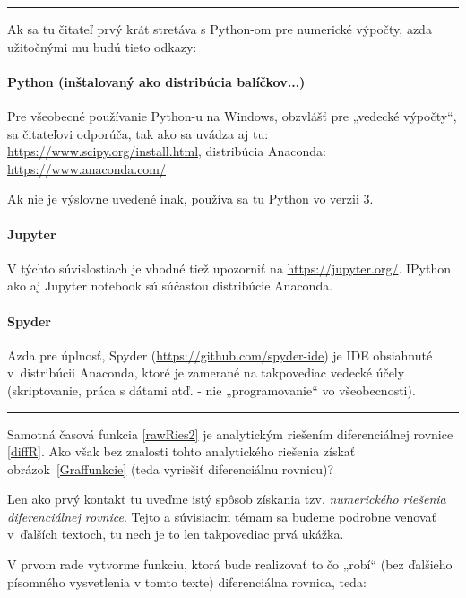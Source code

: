 \documentclass[a4paper, 10pt, ]{article}
\begin{document}
\bigskip

\noindent
\hrule

\medskip

\noindent
Ak sa tu čitateľ prvý krát stretáva s Python-om pre numerické výpočty, azda užitočnými mu budú tieto odkazy:

\paragraph{Python (inštalovaný ako distribúcia balíčkov...)}
Pre všeobecné používanie Python-u na Windows, obzvlášť pre „vedecké výpočty“, sa čitateľovi odporúča, tak ako sa uvádza aj tu: \url{https://www.scipy.org/install.html}, distribúcia Anaconda: \url{https://www.anaconda.com/}

Ak nie je výslovne uvedené inak, používa sa tu Python vo verzii 3.

\paragraph{Jupyter}
V týchto súvislostiach je vhodné tiež upozorniť na \url{https://jupyter.org/}. IPython ako aj Jupyter notebook sú súčasťou distribúcie Anaconda.

\paragraph{Spyder}
Azda pre úplnosť, Spyder (\url{https://github.com/spyder-ide}) je IDE obsiahnuté v~distribúcii Anaconda, ktoré je zamerané na takpovediac vedecké účely (skriptovanie, práca s dátami atď. - nie „programovanie“ vo všeobecnosti).

\medskip

\noindent
\hrule

\bigskip




Samotná časová funkcia \eqref{rawRies2} je analytickým riešením diferenciálnej rovnice \eqref{diffR}. Ako však bez znalosti tohto analytického riešenia získať obrázok~\ref{Graffunkcie} (teda vyriešiť diferenciálnu rovnicu)?

Len ako prvý kontakt tu uveďme istý spôsob získania tzv. \emph{numerického riešenia diferenciálnej rovnice}. Tejto a súvisiacim témam sa budeme podrobne venovať v~ďalších textoch, tu nech je to len takpovediac prvá ukážka.

V prvom rade vytvorme funkciu, ktorá bude realizovať to čo „robí“ (bez ďalšieho písomného vysvetlenia v tomto texte) diferenciálna rovnica, teda:
\end{document}
